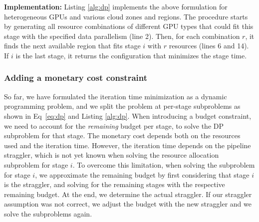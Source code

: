 \textbf{Implementation:} Listing \ref{alg:dp} implements the above formulation for heterogeneous GPUs and various cloud zones and regions. The procedure starts by generating all resource combinations of different GPU types that could fit this stage with the specified data parallelism (line 2). Then, for each combination $r$, it finds the next available region that fits stage $i$ with $r$ resources (lines 6 and 14). If $i$ is the last stage, it returns the configuration that minimizes the stage time.


\subsubsection{Adding a monetary cost constraint}\label{planner_dp_cost}


So far, we have formulated the iteration time minimization as a dynamic programming problem, and we split the problem at per-stage subproblems as shown in Eq~\ref{eq:dp} and Listing \ref{alg:dp}. When introducing a budget constraint, we need to account for the \textit{remaining} budget per stage, to solve the DP subproblem for that stage. The monetary cost depends both on the resources used and the iteration time. However, the iteration time depends on the pipeline straggler, which is not yet known when solving the resource allocation subproblem for stage $i$. To overcome this limitation, when solving the subproblem for stage $i$, we approximate the remaining budget by first considering that stage $i$ is the straggler, and solving for the remaining stages with the respective remaining budget. At the end, we determine the actual straggler. If our straggler assumption was not correct,  we adjust the budget with the new straggler and we solve the subproblems again.

